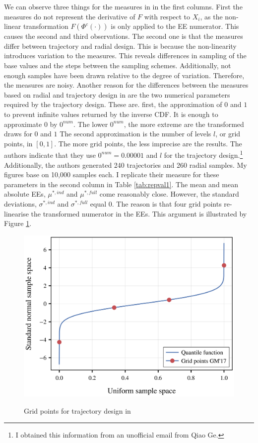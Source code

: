 \documentclass[a4paper,12pt]{article}
\begin{document}
\newpage
\noindent
We can observe three things for the measures in \cite{ge2017extending} in the first columns. First the measures do not represent the derivative of $F$ with respect to $X_i$, as the non-linear transformation $F(\Phi^c(\cdot))$ is only applied to the EE numerator. This causes the second and third observations. The second one is that the measures differ between trajectory and radial design. This is because the non-linearity introduces variation to the measures. This reveals differences in sampling of the base values and the steps between the sampling schemes. Additionally, not enough samples have been drawn relative to the degree of variation. Therefore, the measures are noisy. Another reason for the differences between the measures based on radial and trajectory design in \cite{ge2017extending} are the two numerical parameters required by the trajectory design. These are. first, the approximation of $0$ and $1$ to prevent infinite values returned by the inverse CDF. It is enough to approximate $0$ by $0^{num}$. The lower $0^{num}$, the more extreme are the transformed draws for $0$ and $1$ The second approximation is the number of levels $l$, or grid points, in $[0,1]$. The more grid points, the less imprecise are the results.
The authors indicate that they use $0^{num}=0.00001$ and $l$ for the trajectory design.\footnote{I obtained this information from an unofficial email from Qiao Ge.} Additionally, the authors generated 240 trajectories and 260 radial samples. My figures base on 10,000 samples each. I replicate their measure for these parameters in the second column in Table \ref{tab:repval1}. The mean and mean absolute EEs, $\mu^{*,ind}$ and $\mu^{*,full}$ come reasonably close. However, the standard deviations, $\sigma^{*,ind}$ and $\sigma^{*,full}$ equal 0. The reason is that four grid points re-linearise the transformed numerator in the EEs. This argument is illustrated by Figure \ref{fig:invcdf}.



\begin{figure}[H]
	\caption{Grid points for trajectory design in \cite{ge2017extending}}
	\centering
	\includegraphics[scale=0.40]{../../../scrypy/figures/quantile_fct}
	\label{fig:invcdf}
\end{figure}
\end{document}
